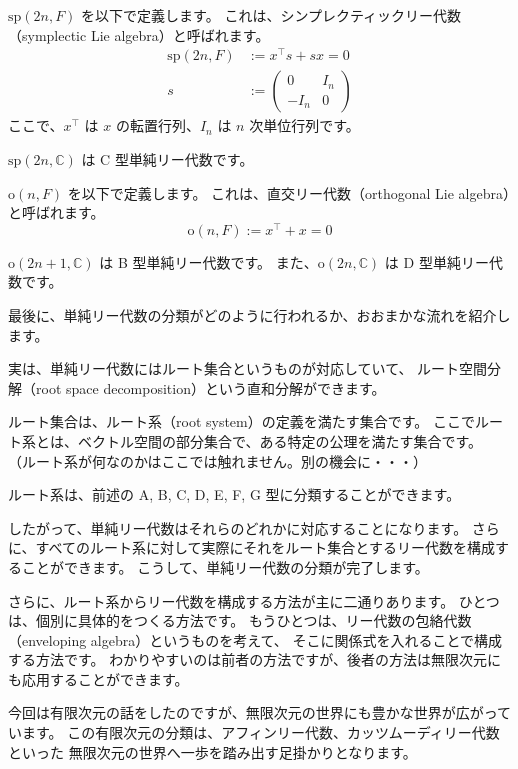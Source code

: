 \documentclass{ltjsarticle}
\begin{document}
\begin{example}[C型単純リー代数]
    $\mathrm{sp}(2n,F)$ を以下で定義します。
    これは、シンプレクティックリー代数（symplectic Lie algebra）と呼ばれます。
    \begin{align*}
        \mathrm{sp}(2n,F) & := x^{\intercal}s + sx = 0    \\
        s                 & := \begin{pmatrix}
            0     & I_n \\
            - I_n & 0
        \end{pmatrix}
    \end{align*}
    ここで、$x^{\intercal}$ は $x$ の転置行列、$I_n$ は $n$ 次単位行列です。

    $\mathrm{sp}(2n,\mathbb{C})$ は C 型単純リー代数です。
\end{example}

\begin{example}[B型およびD型単純リー代数]
    $\mathrm{o}(n,F)$ を以下で定義します。
    これは、直交リー代数（orthogonal Lie algebra）と呼ばれます。
    \[
        \mathrm{o}(n,F) := x^{\intercal} + x = 0
    \]

    $\mathrm{o}(2n+1,\mathbb{C})$ は B 型単純リー代数です。
    また、$\mathrm{o}(2n,\mathbb{C})$ は D 型単純リー代数です。
\end{example}

最後に、単純リー代数の分類がどのように行われるか、おおまかな流れを紹介します。

実は、単純リー代数にはルート集合というものが対応していて、
ルート空間分解（root space decomposition）という直和分解ができます。

ルート集合は、ルート系（root system）の定義を満たす集合です。
ここでルート系とは、ベクトル空間の部分集合で、ある特定の公理を満たす集合です。
（ルート系が何なのかはここでは触れません。別の機会に・・・）

ルート系は、前述の A, B, C, D, E, F, G 型に分類することができます。

したがって、単純リー代数はそれらのどれかに対応することになります。
さらに、すべてのルート系に対して実際にそれをルート集合とするリー代数を構成することができます。
こうして、単純リー代数の分類が完了します。

さらに、ルート系からリー代数を構成する方法が主に二通りあります。
ひとつは、個別に具体的をつくる方法です。
もうひとつは、リー代数の包絡代数（enveloping algebra）というものを考えて、
そこに関係式を入れることで構成する方法です。
わかりやすいのは前者の方法ですが、後者の方法は無限次元にも応用することができます。

今回は有限次元の話をしたのですが、無限次元の世界にも豊かな世界が広がっています。
この有限次元の分類は、アフィンリー代数、カッツムーディリー代数といった
無限次元の世界へ一歩を踏み出す足掛かりとなります。
\end{document}
